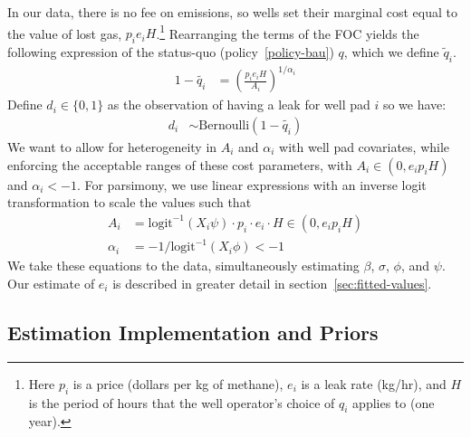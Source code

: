 \documentclass[12pt,oneside,letterpaper]{article}
\theoremstyle{definition}
\begin{document}
\begin{refsection}
In our data, there is no fee on emissions, so wells set their marginal cost equal to the value of lost gas, \(p_i e_i H\).\footnote{%
Here \(p_i\) is a price (dollars per kg of methane),
\(e_i\) is a leak rate (kg/hr), and
\(H\) is the period of hours that the well operator's choice of \(q_i\) applies to (one year).
}
Rearranging the terms of the \gls{FOC} yields the following expression of the status-quo (policy~\ref{policy-bau}) \(q\), which we define \(\tilde{q}_i\).
\begin{align*}
    1 - \tilde{q_i} &= \left(\frac{p_i e_i H}{A_i}\right) ^{1 / \alpha_i}
\end{align*}
Define \(d_i \in \{0, 1\}\) as the observation of having a leak for well pad \(i\) so we have:
\begin{align*}
    d_i &\sim \text{Bernoulli}(1 - \tilde{q_i})
\end{align*}
We want to allow for heterogeneity in \(A_i\) and \(\alpha_i\) with well pad covariates, while enforcing the acceptable ranges of these cost parameters, with \(A_i \in (0, e_i p_i H)\) and \(\alpha_i < -1\).
For parsimony, we use linear expressions with an inverse logit transformation to scale the values such that
\begin{align}
\label{eqn:cost-param-bounds}
    A_i &= \text{logit}^{-1}(X_i\psi) \cdot p_i \cdot e_i \cdot H \in (0, e_i p_i H)\\
    \alpha_i &= -1 / \text{logit}^{-1}(X_i\phi) < -1 \nonumber
\end{align}
We take these equations to the data,
simultaneously estimating \(\beta\), \(\sigma\), \(\phi\), and \(\psi\).
Our estimate of \(e_i\) is described in greater detail in section~\ref{sec:fitted-values}.

\subsection{Estimation Implementation and Priors}
\label{sec:estimation-implementation-and-priors}


\end{refsection}
\end{document}
